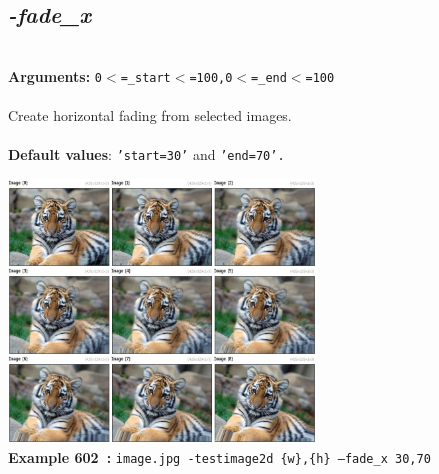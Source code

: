 \documentclass[a4paper,11pt,twoside]{book}
\begin{document}
\subsection{\emph{-fade\_x} }\vspace*{-0.5em}
~\\\textbf{Arguments: } 
{\small \texttt{0$<$=\_start$<$=100,0$<$=\_end$<$=100}}\\~\\
Create horizontal fading from selected images.
~\\~\\\textbf{Default values}: {\small \texttt{'start=30'} and \texttt{'end=70'.}}
\begin{center}\includegraphics[keepaspectratio=true,height=7cm,width=\textwidth]{img/gmic_def602.jpg}\\
{\footnotesize \textbf{Example 602~:} \texttt{image.jpg -testimage2d \{w\},\{h\} --fade\_x 30,70}}
\end{center}
\end{document}
